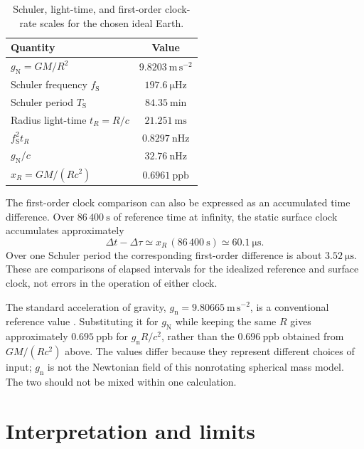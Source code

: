 \documentclass[12pt]{article}
\begin{document}
\begin{table}[ht]
  \centering
  \caption{Schuler, light-time, and first-order clock-rate scales for the chosen ideal Earth.}
  \label{tab:scales}
  \begin{tabular}{lc}
    \toprule
    Quantity & Value \\
    \midrule
    $g_{\mathrm{N}}=GM/R^2$ & $9.8203\ \mathrm{m\,s^{-2}}$ \\
    Schuler frequency $f_{\mathrm{S}}$ & $197.6\ \mathrm{\mu Hz}$ \\
    Schuler period $T_{\mathrm{S}}$ & $84.35\ \mathrm{min}$ \\
    Radius light-time $t_R=R/c$ & $21.251\ \mathrm{ms}$ \\
    $f_{\mathrm{S}}^2t_R$ & $0.8297\ \mathrm{nHz}$ \\
    $g_{\mathrm{N}}/c$ & $32.76\ \mathrm{nHz}$ \\
    $x_R=GM/(Rc^2)$ & $0.6961\ \mathrm{ppb}$ \\
    \bottomrule
  \end{tabular}
\end{table}

The first-order clock comparison can also be expressed as an accumulated time difference. Over $86\,400\ \mathrm{s}$ of reference time at infinity, the static surface clock accumulates approximately
\begin{equation}
  \Delta t-\Delta\tau
  \simeq x_R\,(86\,400\ \mathrm{s})
  \simeq60.1\ \mathrm{\mu s}.
  \label{eq:daily-lag}
\end{equation}
Over one Schuler period the corresponding first-order difference is about $3.52\ \mathrm{\mu s}$. These are comparisons of elapsed intervals for the idealized reference and surface clock, not errors in the operation of either clock.

The standard acceleration of gravity, $g_{\mathrm{n}}=9.80665\ \mathrm{m\,s^{-2}}$, is a conventional reference value \cite{CGPM1901}. Substituting it for $g_{\mathrm{N}}$ while keeping the same $R$ gives approximately $0.695\ \mathrm{ppb}$ for $g_{\mathrm{n}}R/c^2$, rather than the $0.696\ \mathrm{ppb}$ obtained from $GM/(Rc^2)$ above. The values differ because they represent different choices of input; $g_{\mathrm{n}}$ is not the Newtonian field of this nonrotating spherical mass model. The two should not be mixed within one calculation.

\section{Interpretation and limits}
\end{document}
